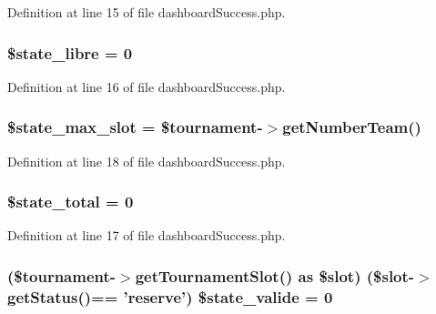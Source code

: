 Definition at line 15 of file dashboard\-Success.\-php.

\hypertarget{dashboard_success_8php_ab312d14793b9c36c5991645be5bf68ad}{
\subsubsection[{\$state\-\_\-libre}]{\setlength{\rightskip}{0pt plus 5cm}\$state\-\_\-libre = 0}}\label{dashboard_success_8php_ab312d14793b9c36c5991645be5bf68ad}


Definition at line 16 of file dashboard\-Success.\-php.

\hypertarget{dashboard_success_8php_a25a9c16257ded9c5abc5490291886b22}{
\subsubsection[{\$state\-\_\-max\-\_\-slot}]{\setlength{\rightskip}{0pt plus 5cm}\$state\-\_\-max\-\_\-slot = \$tournament-\/$>$get\-Number\-Team()}}\label{dashboard_success_8php_a25a9c16257ded9c5abc5490291886b22}


Definition at line 18 of file dashboard\-Success.\-php.

\hypertarget{dashboard_success_8php_a344152e8335a2555919a4fdf6bfa34ca}{
\subsubsection[{\$state\-\_\-total}]{\setlength{\rightskip}{0pt plus 5cm}\$state\-\_\-total = 0}}\label{dashboard_success_8php_a344152e8335a2555919a4fdf6bfa34ca}


Definition at line 17 of file dashboard\-Success.\-php.

\hypertarget{dashboard_success_8php_af3a474618823746201622a7739282918}{
\subsubsection[{\$state\-\_\-valide}]{ (\$tournament-\/$>$get\-Tournament\-Slot() as \$slot) (\$slot-\/$>$get\-Status()== 'reserve') \$state\-\_\-valide = 0}}\label{dashboard_success_8php_af3a474618823746201622a7739282918}


